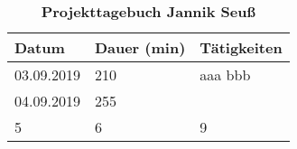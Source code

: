 \documentclass{article}
\begin{document}
\begin {table}
\caption{ \textbf{Projekttagebuch Jannik Seuß} }
\begin{tabular}{ |p{}| p{}| p{}|}
	\hline
	Datum & Dauer (min) & Tätigkeiten \\
	\hline
	03.09.2019 & 210 & \textbullet aaa \newline \textbullet bbb 
	\\
	\hline 
	04.09.2019  & 255 & \textbullet  \newline \textbullet \\
	\hline 
	5 & 6 & 9\\
	\hline
\end{tabular}
\end {table}
\end{document}
